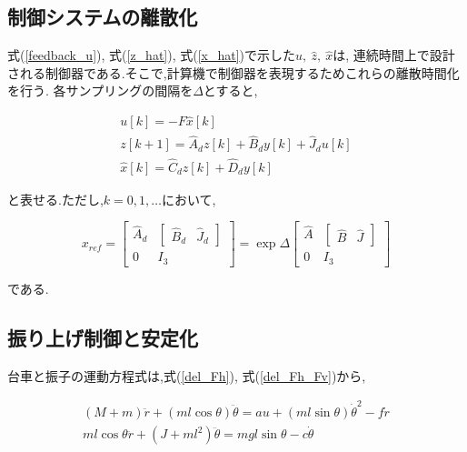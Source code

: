 \subsection{制御システムの離散化}
式(\ref{feedback_u}), 式(\ref{z_hat}), 式(\ref{x_hat})で示した$u,\ \hat{z},\ \hat{x}$は,
連続時間上で設計される制御器である.そこで,計算機で制御器を表現するためこれらの離散時間化を行う.
各サンプリングの間隔を$\Delta$とすると,

$$
    \begin{array}{c}
        u[k] = -F \hat{x}[k] \\
        z[k + 1] = \hat{A}_{d}z[k] + \hat{B}_{d}y[k] + \hat{J}_{d}u[k] \\
        \hat{x}[k] = \hat{C}_{d}z[k] + \hat{D}_{d}y[k]
    \end{array}
$$

と表せる.ただし,$k = 0, 1, \dots$において,

$$
    x_{ref} = 
    \left[
        \begin{array}{cc}
            \hat{A}_{d}  &  \left[
                                \begin{array}{cc}
                                    \hat{B}_{d}  &  \hat{J}_{d}
                                \end{array}
                            \right] \\
            0            &  I_{3}
        \end{array}
    \right]
    =
    \exp \Delta
    \left[
        \begin{array}{cc}
            \hat{A}  &  \left[
                            \begin{array}{cc}
                                \hat{B}  &  \hat{J}
                            \end{array}
                        \right] \\
            0        &  I_{3}
        \end{array}
    \right]
$$

である.

\subsection{振り上げ制御と安定化}
台車と振子の運動方程式は,式(\ref{del_Fh}), 式(\ref{del_Fh_Fv})から,

$$
    \begin{array}{c}
        (M + m) \ddot{r} + (ml\cos{\theta}) \ddot{\theta} 
            = au + (ml\sin{\theta}) \dot{\theta}^2 - f \dot{r} \\
        ml\cos{\theta} \ddot{r} + (J + ml^2) \ddot{\theta} 
            = mgl\sin{\theta} -c \dot{\theta}
    \end{array}
$$

